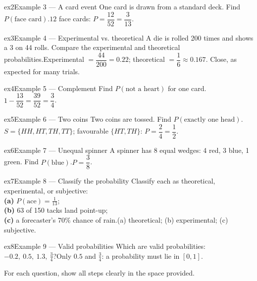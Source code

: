 \documentclass[11pt]{article}
\begin{document}
\begin{example}{ex2}{Example 3 --- A card event}
One card is drawn from a standard deck. Find $P(\text{face card})$.\soln $12$ face cards: $P=\dfrac{12}{52}=\dfrac{3}{13}$.
\end{example}

\begin{example}{ex3}{Example 4 --- Experimental vs. theoretical}
A die is rolled 200 times and shows a 3 on 44 rolls. Compare the experimental and theoretical probabilities.\soln Experimental $=\dfrac{44}{200}=0.22$; theoretical $=\dfrac16\approx0.167$. Close, as expected for many trials.
\end{example}

\begin{example}{ex4}{Example 5 --- Complement}
Find $P(\text{not a heart})$ for one card.\soln $1-\dfrac{13}{52}=\dfrac{39}{52}=\dfrac34$.
\end{example}

\begin{example}{ex5}{Example 6 --- Two coins}
Two coins are tossed. Find $P(\text{exactly one head})$.\soln $S=\{HH,HT,TH,TT\}$; favourable $\{HT,TH\}$: $P=\dfrac24=\dfrac12$.
\end{example}

\begin{example}{ex6}{Example 7 --- Unequal spinner}
A spinner has 8 equal wedges: 4 red, 3 blue, 1 green. Find $P(\text{blue})$.\soln $P=\dfrac38$.
\end{example}

\begin{example}{ex7}{Example 8 --- Classify the probability}
Classify each as theoretical, experimental, or subjective: \\ \textbf{(a)} $P(\text{ace})=\tfrac{1}{13}$; \\ \textbf{(b)} 63 of 150 tacks land point-up; \\ \textbf{(c)} a forecaster's 70\% chance of rain.\soln (a) theoretical; (b) experimental; (c) subjective.
\end{example}

\begin{example}{ex8}{Example 9 --- Valid probabilities}
Which are valid probabilities: $-0.2,\ 0.5,\ 1.3,\ \tfrac34$?\soln Only $0.5$ and $\tfrac34$: a probability must lie in $[0,1]$.
\end{example}

\clearpage
{}
For each question, show all steps clearly in the space provided.
\end{document}

